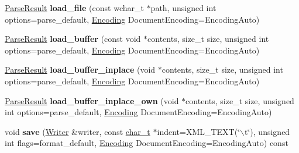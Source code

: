 \begin{DoxyCompactItemize}
\item 
\hypertarget{classphys_1_1xml_1_1Document_a30745deda6328458643a26901ae2db5c}{
\hyperlink{structphys_1_1xml_1_1ParseResult}{ParseResult} {\bfseries load\_\-file} (const wchar\_\-t $\ast$path, unsigned int options=parse\_\-default, \hyperlink{namespacephys_1_1xml_a420f5de782438f88160321385bea2015}{Encoding} DocumentEncoding=EncodingAuto)}
\label{dd/d44/classphys_1_1xml_1_1Document_a30745deda6328458643a26901ae2db5c}

\item 
\hypertarget{classphys_1_1xml_1_1Document_adae01115ae40a2ba8b4e9cd292a6de8a}{
\hyperlink{structphys_1_1xml_1_1ParseResult}{ParseResult} {\bfseries load\_\-buffer} (const void $\ast$contents, size\_\-t size, unsigned int options=parse\_\-default, \hyperlink{namespacephys_1_1xml_a420f5de782438f88160321385bea2015}{Encoding} DocumentEncoding=EncodingAuto)}
\label{dd/d44/classphys_1_1xml_1_1Document_adae01115ae40a2ba8b4e9cd292a6de8a}

\item 
\hypertarget{classphys_1_1xml_1_1Document_a9db9d658878023b003a236df65946b47}{
\hyperlink{structphys_1_1xml_1_1ParseResult}{ParseResult} {\bfseries load\_\-buffer\_\-inplace} (void $\ast$contents, size\_\-t size, unsigned int options=parse\_\-default, \hyperlink{namespacephys_1_1xml_a420f5de782438f88160321385bea2015}{Encoding} DocumentEncoding=EncodingAuto)}
\label{dd/d44/classphys_1_1xml_1_1Document_a9db9d658878023b003a236df65946b47}

\item 
\hypertarget{classphys_1_1xml_1_1Document_ae136da574c0881426227750dcc45c1f7}{
\hyperlink{structphys_1_1xml_1_1ParseResult}{ParseResult} {\bfseries load\_\-buffer\_\-inplace\_\-own} (void $\ast$contents, size\_\-t size, unsigned int options=parse\_\-default, \hyperlink{namespacephys_1_1xml_a420f5de782438f88160321385bea2015}{Encoding} DocumentEncoding=EncodingAuto)}
\label{dd/d44/classphys_1_1xml_1_1Document_ae136da574c0881426227750dcc45c1f7}

\item 
\hypertarget{classphys_1_1xml_1_1Document_aa6aa0d4ccb2d4fcd46244c1962f21d0b}{
void {\bfseries save} (\hyperlink{classphys_1_1xml_1_1Writer}{Writer} \&writer, const \hyperlink{namespacephys_1_1xml_afc87705cd1c2917d87b879715a2d8f6e}{char\_\-t} $\ast$indent=XML\_\-TEXT(\char`\"{}$\backslash$t\char`\"{}), unsigned int flags=format\_\-default, \hyperlink{namespacephys_1_1xml_a420f5de782438f88160321385bea2015}{Encoding} DocumentEncoding=EncodingAuto) const }
\label{dd/d44/classphys_1_1xml_1_1Document_aa6aa0d4ccb2d4fcd46244c1962f21d0b}


\end{DoxyCompactItemize}
